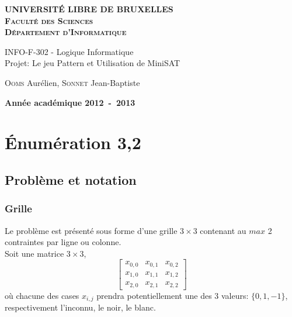 \documentclass[a4paper,12pt]{report}
\begin{document}
\setlength\parindent{0pt} %


\begin{titlepage}
\begin{center}
\textbf{\textsc{UNIVERSIT\'E LIBRE DE BRUXELLES}}\\
\textbf{\textsc{Faculté des Sciences}}\\
\textbf{\textsc{Département d'Informatique}}
\vfill{}\vfill{}
\begin{center}{\Huge INFO-F-302 - Logique Informatique \\Projet: Le jeu Pattern et Utilisation de MiniSAT}\end{center}{\Huge \par}
\begin{center}{\large \textsc{Ooms} Aurélien, \textsc{Sonnet} Jean-Baptiste}\end{center}{\Huge \par}
\vfill{}\vfill{}
\vfill{}\vfill{}\enlargethispage{3cm}
\textbf{Année académique 2012~-~2013}
\end{center}
\end{titlepage}




\tableofcontents
\newpage


\chapter{Énumération 3,2}

\section{Problème et notation}
\subsection{Grille}
Le problème est présenté sous forme d'une grille $3\times3$ contenant au $max$ 2 contraintes par ligne ou colonne.\\

Soit une matrice $3\times3$,  
$$\begin{bmatrix} x_{0,0} & x_{0,1} & x_{0,2} \\ x_{1,0} & x_{1,1} & x_{1,2} \\ x_{2,0} & x_{2,1} & x_{2,2}\end{bmatrix}$$ 
où chacune des cases $x_{i,j}$ prendra potentiellement une des 3 valeurs: 
$\{0,1,-1\}$, respectivement l'inconnu, le noir, le blanc.\\
\end{document}
